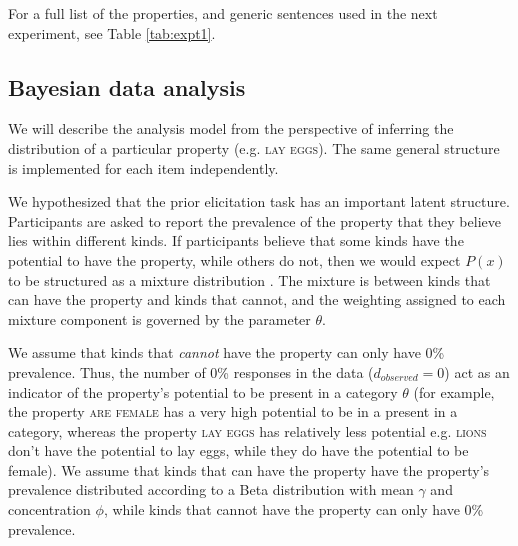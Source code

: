 \documentclass[10pt,letterpaper]{article}
\begin{document}
For a full list of the properties, and generic sentences used in the next experiment, see Table \ref{tab:expt1}.

\subsection{Bayesian data analysis}
\label{sec:bda1}

We will describe the analysis model from the perspective of inferring the distribution of a particular property (e.g. \textsc{lay eggs}). 
The same general structure is implemented for each item independently. 

We hypothesized that the prior elicitation task has an important latent structure. 
Participants are asked to report the prevalence of the property that they believe lies within different kinds.
If participants believe that some kinds have the potential to have the property, while others do not, then we would expect $P(x)$ to be structured as a mixture distribution \cite{Griffiths2005}.
The mixture is between kinds that can have the property and kinds that cannot, and the weighting assigned to each mixture component is governed by the parameter $\theta$.

We assume that kinds that \emph{cannot} have the property can only have 0\% prevalence. 
 Thus, the number of 0\% responses in the data ($d_{observed} = 0$) act as an indicator of the property's potential to be present in a category $\theta$ (for example, the property \textsc{are female} has a very high potential to be in a present in a category, whereas the property \textsc{lay eggs} has relatively less potential e.g. \textsc{lions} don't have the potential to lay eggs, while they do have the potential to be female).
  We assume that kinds that can have the property have the property's prevalence distributed according to a Beta distribution with mean $\gamma$ and concentration $\phi$, while kinds that cannot have the property can only have 0\% prevalence. 
\end{document}
